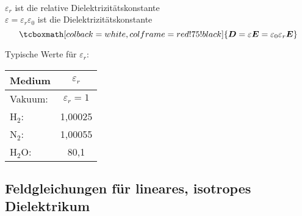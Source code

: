 \documentclass[titlepage,11pt,a4paper,ngerman]{report}
\newcommand{\tx}[1]{\textrm{#1}}
\renewcommand{\vec}[1]{\boldsymbol{#1}}
\renewcommand{\epsilon}{\varepsilon}
\newcommand{\rmbox}[1]{\tcboxmath[colback=white,colframe=red!75!black]{#1}}
\begin{document}
\begin{enumerate}[i)]
\begin{align*}
	\end{align*}
	\begin{minipage}{.6\linewidth}
		$ \epsilon_r $ ist die relative Dielektrizitätskonstante\\
		$ \epsilon = \epsilon_r \epsilon_0 $ ist die Dielektrizitätskonstante
		\begin{equation*}
		\rmbox{\vec{D} = \epsilon \vec{E} = \epsilon_0 \epsilon_r \vec{E}}
		\end{equation*}
	\end{minipage}%
	\begin{minipage}{.4\linewidth}
		\flushleft
		Typische Werte für $ \epsilon_r $:\\[5pt]
		\centering
		\begin{tabular}{l|c}
			Medium & $ \epsilon_r $ \\ \hline 
			Vakuum: & $ \epsilon_r = 1 $ \\
			$ \tx{H}_2 $: & 1,00025 \\
			$ \tx{N}_2 $: & 1,00055 \\
			$ \tx{H}_2 \tx{O} $: & 80,1
		\end{tabular}
	\end{minipage}%
\end{enumerate}

\subsection{Feldgleichungen für lineares, isotropes Dielektrikum} %
\end{document}
